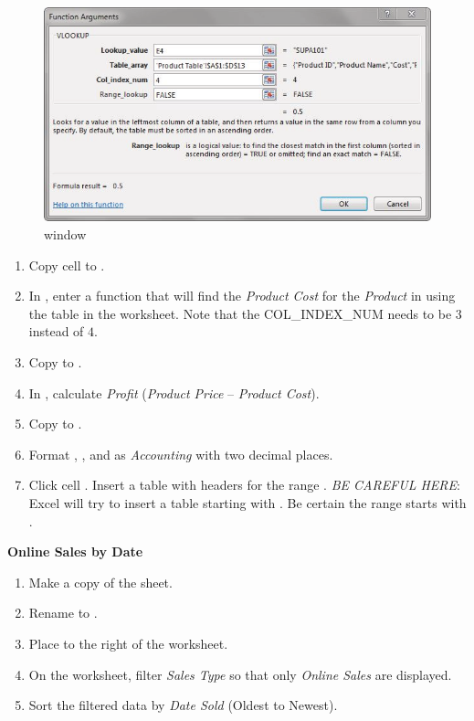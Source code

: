 \begin{figure}[H]
	\centering
	\includegraphics[width=\maxwidth{.95\linewidth}]{gfx/ch05_fig32}
	\caption{ window}
	\label{05:fig32}
\end{figure}

\begin{enumerate}[resume]
	\item Copy cell  to . 
	\item In , enter a  function that will find the \textit{Product Cost} for the \textit{Product} in  using the table in the  worksheet. Note that the COL\_INDEX\_NUM needs to be $ 3 $ instead of $ 4 $. 
	\item Copy  to .
	\item In , calculate \textit{Profit} (\textit{Product Price} $ – $ \textit{Product Cost}).
	\item Copy  to .
	\item Format , , and  as \textit{Accounting} with two decimal places.
	\item Click cell . Insert a table with headers for the range . \textit{BE CAREFUL HERE}: Excel will try to insert a table starting with . Be certain the range starts with .
\end{enumerate}

\noindent
\textbf{Online Sales by Date}

\begin{enumerate}[resume]
	\item Make a copy of the  sheet.
	\item Rename  to . \item Place  to the right of the  worksheet. 
	\item On the  worksheet, filter \textit{Sales Type} so that only \textit{Online Sales} are displayed. 
	\item Sort the filtered data by \textit{Date Sold} (Oldest to Newest).
\end{enumerate}

